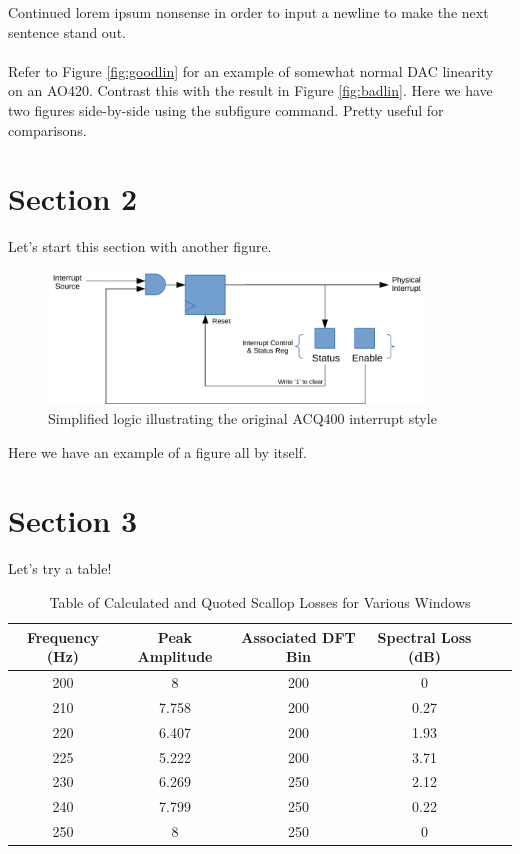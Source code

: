 \documentclass[]{article}
\begin{document}
Continued lorem ipsum nonsense in order to input a newline to make the next sentence stand out.\\\\
Refer to Figure \ref{fig:goodlin} for an example of somewhat normal DAC linearity on an AO420.
Contrast this with the result in Figure \ref{fig:badlin}.
Here we have two figures side-by-side using the subfigure command. Pretty useful for comparisons.

\section{Section 2}
Let's start this section with another figure.

\begin{figure} [h]
	\centering
	\includegraphics[width=100mm]{images/original_interrupt_style}
	\caption{Simplified logic illustrating the original ACQ400 interrupt style}
	\label{orig_int}
\end{figure}

Here we have an example of a figure all by itself.\\
\lipsum[1]

\section{Section 3}
Let's try a table!

\begin{table}[h]
	\begin{center}
		\begin{tabular}{|c|c|c|c|c|c|}
			
			\hline Frequency (Hz) & Peak Amplitude & Associated DFT Bin & Spectral Loss (dB)\\ 
			\hline 200 & 8 & 200 & 0 \\ 
			\hline 210 & 7.758 & 200 & 0.27 \\ 
			\hline 220 & 6.407 & 200 & 1.93 \\
			\hline 225 & 5.222 & 200 & 3.71 \\
			\hline 230 & 6.269 & 250 & 2.12 \\
			\hline 240 & 7.799 & 250 & 0.22 \\
			\hline 250 & 8 & 250 & 0 \\
			\hline 
		\end{tabular}\\
		\caption{Table of Calculated and Quoted Scallop Losses for Various Windows}
		\label{fig:TableScallop}
	\end{center}
\end{table}
\end{document}
